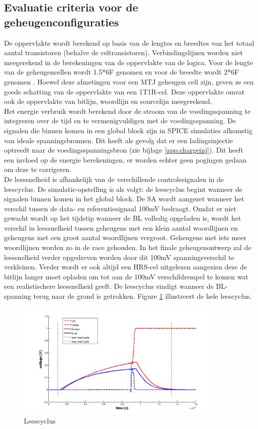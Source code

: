 \subsection{Evaluatie criteria voor de geheugenconfiguraties}
De oppervlakte wordt berekend op basis van de lengtes en breedtes van het totaal aantal transistoren (behalve de celtransistoren). Verbindingslijnen worden niet meegerekend in de berekeningen van de oppervlakte van de logica. Voor de lengte van de geheugencellen wordt 1.5*6F genomen en voor de breedte wordt 2*6F genomen \cite{ppt:cosemans}. Hoewel deze afmetingen voor een MTJ geheugen cell zijn, geven ze een goede schatting van de oppervlakte van een 1T1R-cel. Deze oppervlakte omvat ook de oppervlakte van bitlijn, woordlijn en sourcelijn meegerekend. \\
Het energie verbruik wordt berekend door de stroom van de voedingsspanning te integreren over de tijd en te vermenigvuldigen met de voedingsspanning. De signalen die binnen komen in een global block zijn in SPICE simulaties afkomstig van ideale spanningsbronnen. Dit heeft als gevolg dat er een ladingsinjectie optreedt naar de voedingsspanningsbron (zie bijlage \ref{app:chargeinj}). Dit heeft een invloed op de energie berekeningen, er worden echter geen pogingen gedaan om deze te corrigeren. \\
De leessnelheid is afhankelijk van de verschillende controlesignalen in de leescyclus. De simulatie-opstelling is als volgt: de leescyclus begint wanneer de signalen binnen komen in het global block. De SA wordt aangezet wanneer het verschil tussen de data- en referentiesignaal 100mV bedraagt. Omdat er niet gewacht wordt op het tijdstip wanneer de BL volledig opgeladen is, wordt het verschil in leessnelheid tussen geheugens met een klein aantal woordlijnen en geheugens met een groot aantal woordlijnen vergroot. Geheugens met iets meer woordlijnen worden zo in de race gehouden. In het finale geheugenontwerp zal de leessnelheid verder opgedreven worden door dit 100mV spanningsverschil te verkleinen. Verder wordt er ook altijd een HRS-cel uitgelezen aangezien deze de bitlijn langer moet opladen om tot aan de 100mV verschildrempel te komen wat een realistischere leessnelheid geeft. De leescyclus eindigt wanneer de BL-spanning terug naar de grond is getrokken. Figure \ref{fig:leescyclus} illustreert de hele leescyclus.

\begin{figure}[!ht]
  \centering
  \includegraphics[width=0.9\textwidth]{../fig/hfdstk-timing-leescyclus.png}
  \caption[Leescyclus]{Leescyclus}
  \label{fig:leescyclus}
\end{figure} 

